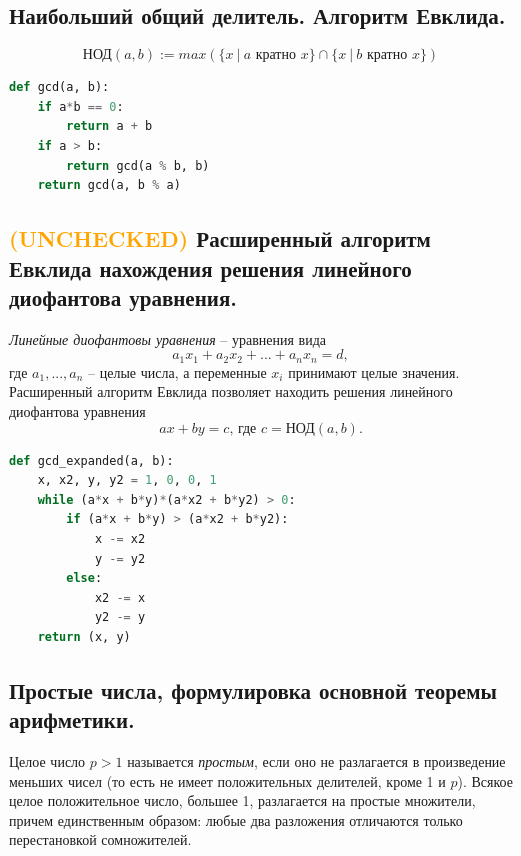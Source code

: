 \documentclass{article}
\begin{document}
\subsection{Наибольший общий делитель. Алгоритм Евклида.}
\[
\text{НОД}(a, b) := max (\{ x \> | \> a \text{ кратно } x \} \cap \{ x \> | \> b \text{ кратно } x \})
\]

\begin{lstlisting}[language=Python]
def gcd(a, b):
    if a*b == 0:
        return a + b
    if a > b:
        return gcd(a % b, b)
    return gcd(a, b % a)
\end{lstlisting}




\subsection{\textcolor{orange}{(UNCHECKED)} Расширенный алгоритм Евклида нахождения решения линейного диофантова уравнения.}
\textit{Линейные диофантовы уравнения} -- уравнения вида
\[
a_1x_1 + a_2x_2 + ... + a_nx_n = d,
\] где $a_1,...,a_n$ -- целые числа, а переменные $x_i$ принимают целые значения.
\newline
\newline
Расширенный алгоритм Евклида позволяет находить решения линейного диофантова уравнения 
\[
ax + by = c \text{, где } c = \text{НОД}(a,b).
\]
\begin{lstlisting}[language=Python]
def gcd_expanded(a, b):
    x, x2, y, y2 = 1, 0, 0, 1
    while (a*x + b*y)*(a*x2 + b*y2) > 0:
        if (a*x + b*y) > (a*x2 + b*y2):
            x -= x2
            y -= y2
        else:
            x2 -= x
            y2 -= y
    return (x, y)
\end{lstlisting}




\subsection{Простые числа, формулировка основной теоремы арифметики.}
Целое число $p > 1$ называется \textit{простым}, если оно не разлагается в произведение меньших чисел (то есть не имеет положительных делителей, кроме 1 и $p$).
\newline
\newline
Всякое целое положительное число, большее 1, разлагается на простые множители, причем единственным образом: любые два разложения отличаются только перестановкой сомножителей.
\end{document}

